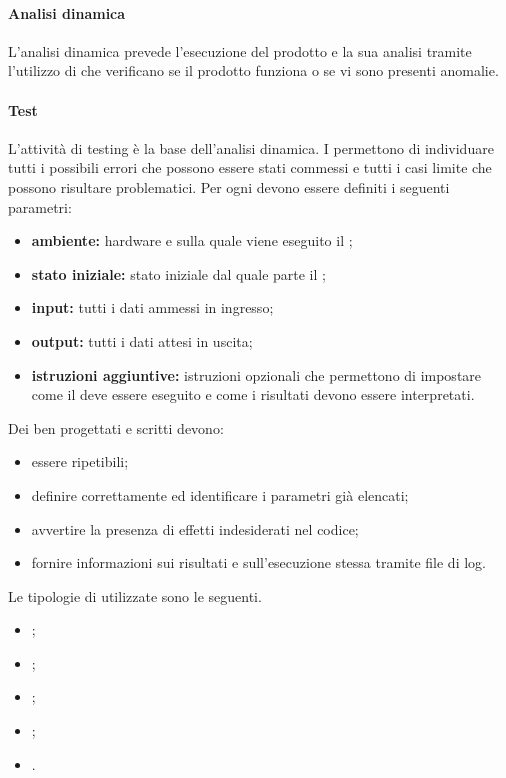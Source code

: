 \paragraph{Analisi dinamica}
L'analisi dinamica prevede l'esecuzione del prodotto  e la sua analisi tramite l'utilizzo di  che verificano se il prodotto funziona o se vi sono presenti anomalie.
\paragraph{Test}
\label{Test}
L'attività di testing è la base dell'analisi dinamica. I  permettono di individuare tutti i possibili errori che possono essere stati commessi e tutti i casi limite che possono risultare problematici. Per ogni  devono essere definiti i seguenti parametri:
\begin{itemize}
	\item \textbf{ambiente:}  hardware e  sulla quale viene eseguito il ;
	\item \textbf{stato iniziale:} stato iniziale dal quale parte il ;
	\item \textbf{input:} tutti i dati ammessi in ingresso;
	\item \textbf{output:} tutti i dati attesi in uscita;
	\item \textbf{istruzioni aggiuntive:} istruzioni opzionali che permettono di impostare come il  deve essere eseguito e come i risultati devono essere interpretati.
\end{itemize}
Dei  ben progettati e scritti devono:
\begin{itemize}
	\item essere ripetibili;
	\item definire correttamente ed identificare i parametri già elencati;
	\item avvertire la presenza di effetti indesiderati nel codice;
	\item fornire informazioni sui risultati e sull'esecuzione stessa tramite file di log.
\end{itemize}
Le tipologie di  utilizzate sono le seguenti.
\begin{itemize}
	\item {};
	\item {};
	\item {};
	\item {};
	\item {}.
\end{itemize}
